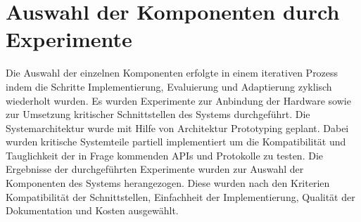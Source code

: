 \documentclass[BMR,Bachelor,ngerman]{twbook}%
\begin{document}
\section{Auswahl der Komponenten durch Experimente}
Die Auswahl der einzelnen Komponenten erfolgte in einem iterativen Prozess indem die Schritte Implementierung, Evaluierung und Adaptierung zyklisch wiederholt wurden. Es wurden Experimente zur Anbindung der Hardware sowie zur Umsetzung kritischer Schnittstellen des Systems durchgeführt. Die Systemarchitektur wurde mit Hilfe von Architektur Prototyping \cite{pomberger1992methoden} geplant. Dabei wurden kritische Systemteile partiell implementiert um die Kompatibilität und Tauglichkeit der in Frage kommenden \acp{API} und Protokolle zu testen. Die Ergebnisse der durchgeführten Experimente wurden zur Auswahl der Komponenten des Systems herangezogen. Diese wurden nach den Kriterien Kompatibilität der Schnittstellen, Einfachheit der Implementierung, Qualität der Dokumentation und Kosten ausgewählt.
%
\end{document}
